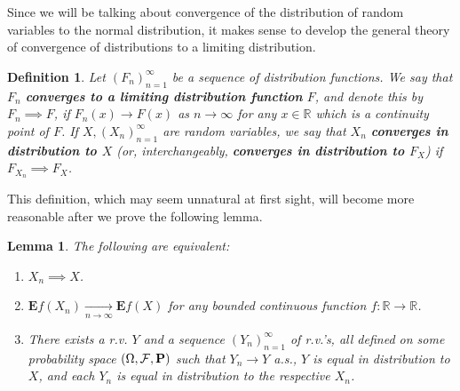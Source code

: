 \documentclass[12pt]{article}
\newtheorem{lem}[thm]{Lemma}
\newtheorem{defi}[thm]{Definition}
\newcommand{\R}{\mathbb{R}}
\newcommand{\prob}{\mathbf{P}}
\newcommand{\expec}{\mathbf{E}}
\theoremstyle{example}
\begin{document}
Since we will be talking about convergence of the distribution of random variables to the normal distribution, it makes sense to develop the general theory of convergence of distributions to a limiting distribution.

\begin{defi} Let $(F_n)_{n=1}^\infty$ be a sequence of distribution functions. We say that $F_n$ \textbf{converges to a limiting distribution function} $F$, and denote this by $F_n \implies F$, if $F_n(x)\to F(x)$ as $n\to\infty$ for any $x\in\R$ which is a continuity point of $F$. If $X, (X_n)_{n=1}^\infty$ are random variables, we say that $X_n$ \textbf{converges in distribution to $X$} (or, interchangeably, \textbf{converges in distribution to $F_X$}) if $F_{X_n}\implies F_X$.
\end{defi}

This definition, which may seem unnatural at first sight, will become more reasonable after we prove the following lemma.

\begin{lem}  The following are equivalent:
\begin{enumerate}
\item $X_n \implies X$.
\item $\expec f(X_n) \xrightarrow[n\to\infty]{} \expec f(X)$ for any bounded continuous function $f:\R\to\R$.
\item There exists a r.v. $Y$ and a sequence $(Y_n)_{n=1}^\infty$ of r.v.'s, all defined on some probability space $(\Omega, {\cal F}, \prob)$ such that $Y_n \to Y$ a.s., $Y$ is equal in distribution to $X$, and each $Y_n$ is equal in distribution to the respective $X_n$.
\end{enumerate}
\end{lem}
\end{document}
